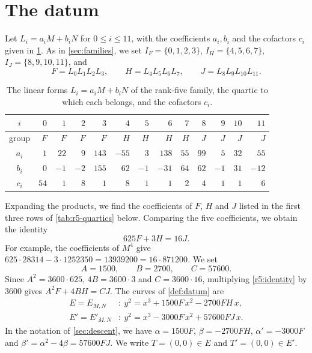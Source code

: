 \documentclass[12pt,oneside,openany]{book}
\theoremstyle{definition}
\theoremstyle{plain}
\numberwithin{equation}{chapter}
\theoremstyle{plain}
\theoremstyle{definition}
\theoremstyle{remark}
\begin{document}
\section{The datum}\label{sec:r5-datum}

Let $L_i=a_iM+b_iN$ for $0\le i\le 11$, with the coefficients $a_i,b_i$ and the cofactors $c_i$ given in \cref{tab:r5-data}. As in \cref{sec:families}, we set $I_F=\{0,1,2,3\}$, $I_H=\{4,5,6,7\}$, $I_J=\{8,9,10,11\}$, and
\[
F=L_0L_1L_2L_3,\qquad H=L_4L_5L_6L_7,\qquad J=L_8L_9L_{10}L_{11}.
\]

\begin{table}[htbp]
\centering
\caption{The linear forms $L_i=a_iM+b_iN$ of the rank-five family, the quartic to which each belongs, and the cofactors $c_i$.}\label{tab:r5-data}
\begin{tabular}{c*{12}{r}}
\toprule
$i$ & $0$ & $1$ & $2$ & $3$ & $4$ & $5$ & $6$ & $7$ & $8$ & $9$ & $10$ & $11$\\
\midrule
group & $F$ & $F$ & $F$ & $F$ & $H$ & $H$ & $H$ & $H$ & $J$ & $J$ & $J$ & $J$\\
$a_i$ & $1$ & $22$ & $9$ & $143$ & $-55$ & $3$ & $138$ & $55$ & $99$ & $5$ & $32$ & $55$\\
$b_i$ & $0$ & $-1$ & $-2$ & $155$ & $62$ & $-1$ & $-31$ & $64$ & $62$ & $-1$ & $31$ & $-12$\\
$c_i$ & $54$ & $1$ & $8$ & $1$ & $8$ & $1$ & $1$ & $2$ & $4$ & $1$ & $1$ & $6$\\
\bottomrule
\end{tabular}
\end{table}

Expanding the products, we find the coefficients of $F$, $H$ and $J$ listed in the first three rows of \cref{tab:r5-quartics} below. Comparing the five coefficients, we obtain the identity
\begin{equation}\label{r5:identity}
625F+3H=16J.
\end{equation}
For example, the coefficients of $M^4$ give $625\cdot28314-3\cdot1252350=13939200=16\cdot871200$. We set
\begin{equation}\label{r5:ABC}
A=1500,\qquad B=2700,\qquad C=57600.
\end{equation}
Since $A^2=3600\cdot625$, $4B=3600\cdot3$ and $C=3600\cdot16$, multiplying \eqref{r5:identity} by $3600$ gives $A^2F+4BH=CJ$. The curves of \cref{def:datum} are
\begin{equation}\label{r5:curves}
\begin{aligned}
E=E_{M,N}&:\ y^2=x^3+1500F\,x^2-2700FH\,x,\\
E'=E'_{M,N}&:\ y^2=x^3-3000F\,x^2+57600FJ\,x.
\end{aligned}
\end{equation}
In the notation of \cref{sec:descent}, we have $\alpha=1500F$, $\beta=-2700FH$, $\alpha'=-3000F$ and $\beta'=\alpha^2-4\beta=57600FJ$. We write $T=(0,0)\in E$ and $T'=(0,0)\in E'$.
\end{document}
